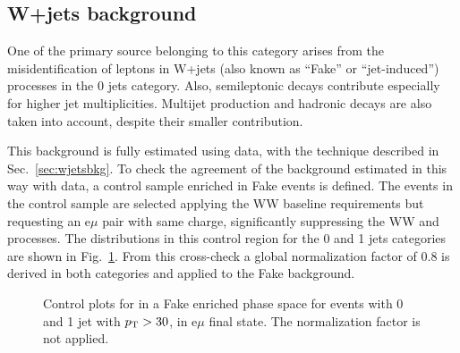 \subsection{W+jets background}

One of the primary source belonging to this category arises from the misidentification of leptons in W+jets (also known as ``Fake'' or ``jet-induced'') processes in the 0 jets category. Also, semileptonic \ttbar decays contribute especially for higher jet multiplicities. Multijet production and hadronic \ttbar decays are also taken into account, despite their smaller contribution.

This background is fully estimated using data, with the technique described in Sec.~\ref{sec:wjetsbkg}. To check the agreement of the background estimated in this way with data, a control sample enriched in Fake events is defined. The events in the control sample are selected applying the WW baseline requirements but requesting an e$\mu$ pair with same charge, significantly suppressing the WW and \ttbar processes. The \mll distributions in this control region for the 0 and 1 jets categories are shown in Fig.~\ref{fig:13TeVsamesign}. From this cross-check a global normalization factor of 0.8 is derived in both categories and applied to the Fake background.

\begin{figure}[htb]
\centering
    \caption{
         Control plots for \mll in a Fake enriched phase space for events with 0 and 1 jet with $p_\mathrm{T} > 30$\GeV, in e$\mu$ final state. The normalization factor is not applied.
         }\label{fig:13TeVsamesign}
\end{figure}

